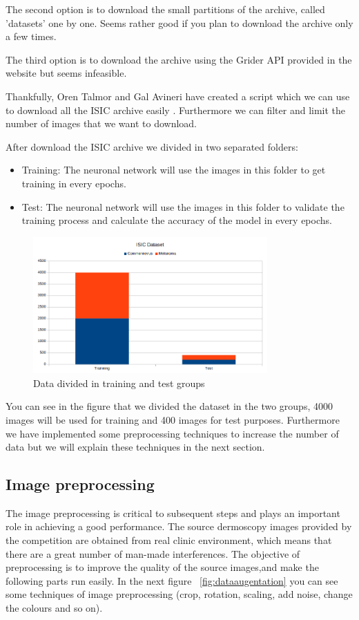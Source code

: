 The second option is to download the small partitions of the archive, called 'datasets' one by one. Seems rather good if you plan to download the archive only a few times.

The third option is to download the archive using the Grider API provided in the website but seems infeasible.


Thankfully, Oren Talmor and Gal Avineri have created a script which we can use to download all the ISIC archive easily \cite{isic-archive-downloader}. Furthermore we can filter and limit the number of images that we want to download.


After download the ISIC archive we divided in two separated folders:
\begin{itemize}
\item Training: The neuronal network will use the images in this folder to get training in every epochs.
\item Test: The neuronal network will use the images in this folder to validate the training process and calculate the accuracy of the model in every epochs.
\end{itemize}


\begin{figure}[H]
\centering
\includegraphics[width=0.8\textwidth]{./figures/dataset-plot-size}
\caption{Data divided in training and test groups}
\end{figure}

You can see in the figure that we divided the dataset in the two groups, 
4000 images will be used for training and 400 images for test purposes.
Furthermore we have implemented some preprocessing techniques to increase the number of data but we will explain these techniques in the next section.

\subsection{Image preprocessing}
The image preprocessing is critical to subsequent steps and plays an important role in achieving a good performance. The source dermoscopy images provided by the competition are obtained from real clinic environment, which means that there are a great number of man-made interferences. The objective of preprocessing is to improve the quality of the source images,and make the following parts run easily. In the next figure 
~\ref{fig:dataaugentation} you can see some techniques of image preprocessing (crop, rotation, scaling, add noise, change the colours and so on).

